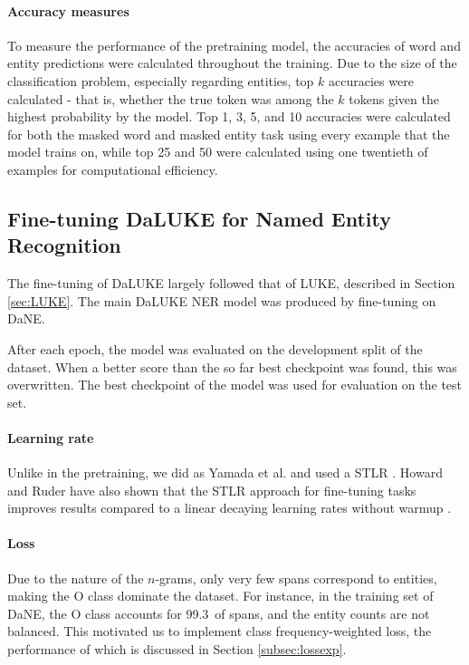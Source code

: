\documentclass[main.tex]{subfiles}
\begin{document}
\paragraph{Accuracy measures}
To measure the performance of the pretraining model, the accuracies of word and entity predictions were calculated throughout the training.
Due to the size of the classification problem, especially regarding entities, top $ k $ accuracies were calculated - that is, whether the true token was among the $ k $ tokens given the highest probability by the model.
Top 1, 3, 5, and 10 accuracies were calculated for both the masked word and masked entity task using every example that the model trains on, while top 25 and 50 were calculated using one twentieth of examples for computational efficiency.

\subsection{Fine-tuning DaLUKE for Named Entity Recognition}%
\label{sub:fine-tune-ner}
The fine-tuning of DaLUKE largely followed that of LUKE, described in Section \ref{sec:LUKE}.
The main DaLUKE NER model was produced by fine-tuning on DaNE.

After each epoch, the model was evaluated on the development split of the dataset.
When a better score than the so far best checkpoint was found, this was overwritten.
The best checkpoint of the model was used for evaluation on the test set.

\paragraph{Learning rate}
Unlike in the pretraining, we did as Yamada et al. and used a STLR \cite{yamada2020luke}.
Howard and Ruder have also shown that the STLR approach for fine-tuning tasks improves results compared to a linear decaying learning rates without warmup \cite{howardruder2018universal}.

\paragraph{Loss}
Due to the nature of the $ n $-grams, only very few spans correspond to entities, making the O class dominate the dataset.
For instance, in the training set of DaNE, the O class accounts for 99.3\pro\ of spans, and the entity counts are not balanced.
This motivated us to implement class frequency-weighted loss, the performance of which is discussed in Section \ref{subsec:lossexp}.
\end{document}
